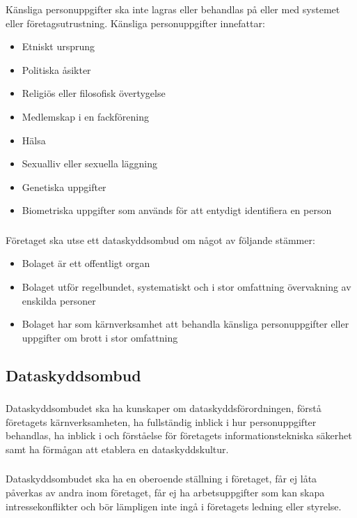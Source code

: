 \documentclass[a4paper,12pt]{article}
\begin{document}
Känsliga personuppgifter ska inte lagras eller behandlas på eller med systemet eller företagsutrustning. Känsliga personuppgifter innefattar:

\begin{itemize}
  \item Etniskt ursprung
  \item Politiska åsikter
  \item Religiös eller filosofisk övertygelse
  \item Medlemskap i en fackförening
  \item Hälsa
  \item Sexualliv eller sexuella läggning
  \item Genetiska uppgifter
  \item Biometriska uppgifter som används för att entydigt identifiera en person
\end{itemize}

\subsubsection{} 

Företaget ska utse ett dataskyddsombud om något av följande stämmer:

\begin{itemize}
  \item Bolaget är ett offentligt organ
  \item Bolaget utför regelbundet, systematiskt och i stor omfattning övervakning av enskilda personer
  \item Bolaget har som kärnverksamhet att behandla känsliga personuppgifter eller uppgifter om brott i stor omfattning
\end{itemize}

\subsection{Dataskyddsombud} \label{dataskyddsombud}

\subsubsection{}

Dataskyddsombudet ska ha kunskaper om dataskyddsförordningen, förstå företagets kärnverksamheten, ha fullständig inblick i hur personuppgifter behandlas, ha inblick i och förståelse för företagets informationstekniska säkerhet samt ha förmågan att etablera en dataskyddskultur.

\subsubsection{}

Dataskyddsombudet ska ha en oberoende ställning i företaget, får ej låta påverkas av andra inom företaget, får ej ha arbetsuppgifter som kan skapa intressekonflikter och bör lämpligen inte ingå i företagets ledning eller styrelse.
\end{document}

